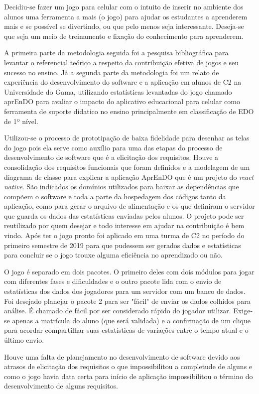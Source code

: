 Decidiu-se fazer um jogo para celular com o intuito de inserir no ambiente dos alunos uma ferramenta a mais (o jogo) para ajudar os estudantes a aprenderem mais e se possível se divertindo, ou que pelo menos seja interessante. Deseja-se que seja um meio de treinamento e fixação do conhecimento para aprenderem.

A primeira parte da metodologia seguida foi a pesquisa bibliográfica para levantar o referencial teórico a respeito da contribuição efetiva de jogos e seu sucesso no ensino. Já a segunda parte da metodologia foi um relato de experiência do desenvolvimento do software e a aplicação em alunos de C2 na Universidade do Gama, utilizando estatísticas levantadas do jogo chamado aprEnDO para avaliar o impacto do aplicativo educacional para celular como ferramenta de suporte didatico no ensino principalmente em classificação de EDO de 1º nível.

Utilizou-se o processo de prototipação de baixa fidelidade para desenhar as telas do jogo pois ela serve como auxílio para uma das etapas do processo de desenvolvimento de software que é a elicitação dos requisitos. Houve a consolidação dos requisitos funcionais que foram definidos e a modelagem de um diagrama de classe para explicar a aplicação AprEnDO que é um projeto do \textit{react native}. São indicados os domínios utilizados para baixar as dependências que compõem o software e toda a parte da hospedagem dos códigos tanto da aplicação, como para gerar o arquivo de alimentação e os que definiram o servidor que guarda os dados das estatísticas enviadas pelos alunos. O projeto pode ser reutilizado por quem desejar e todo interesse em ajudar na contribuição é bem vindo. Após ter o jogo pronto foi aplicado em uma turma de C2 no período do primeiro semestre de 2019 para que pudessem ser gerados dados e estatísticas para concluir se o jogo trouxe alguma eficiência no aprendizado ou não.

O jogo é separado em dois pacotes. O primeiro deles com dois módulos para jogar com diferentes fases e dificuldades e o outro pacote lida com o envio de estatísticas dos dados dos jogadores para um servidor com um banco de dados. Foi desejado planejar o pacote 2 para ser "fácil" de enviar os dados colhidos para análise. É chamado de fácil por ser considerado rápido do jogador utilizar. Exige-se apenas a matrícula do aluno (que será validada) e a confirmação de um clique para acordar compartilhar suas estatísticas de variações entre o tempo atual e o último envio.

Houve uma falta de planejamento no desenvolvimento de software devido aos atrasos de elicitação dos requisitos o que impossibilitou a completude de alguns e como o jogo havia data certa para início de aplicação impossibilitou o término do desenvolvimento de alguns requisitos. 

